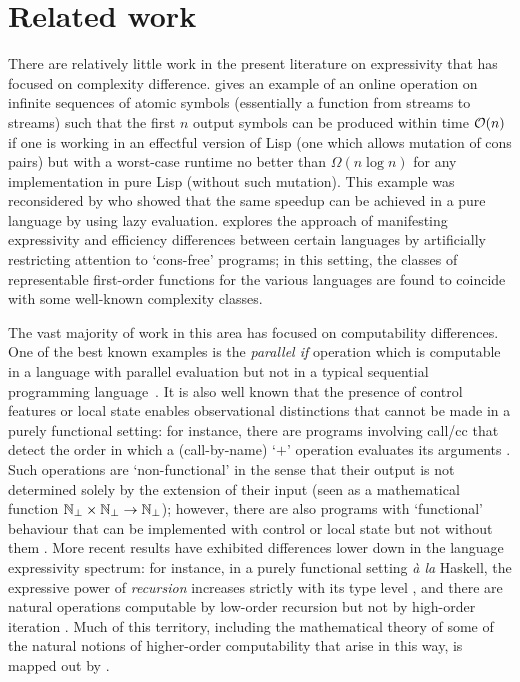 \documentclass[12pt,phd,lfcs,twoside,openright,logo,leftchapter,normalheadings]{infthesis}
\theoremstyle{plain}
\theoremstyle{definition}
\begin{document}
\section{Related work}
There are relatively little work in the present literature on
expressivity that has focused on complexity difference.
%
\citet{Pippenger96} gives an example of an online operation on
infinite sequences of atomic symbols (essentially a function from
streams to streams) such that the first $n$ output symbols can be
produced within time $\mathcal{O}(n)$ if one is working in an effectful
version of Lisp (one which allows mutation of cons pairs) but with a
worst-case runtime no better than $\Omega(n \log n)$ for any
implementation in pure Lisp (without such mutation). This example was
reconsidered by \citet{BirdJdM97} who showed that the same speedup can
be achieved in a pure language by using lazy evaluation.
\citet{Jones01} explores the approach of manifesting expressivity and
efficiency differences between certain languages by artificially
restricting attention to `cons-free' programs; in this setting, the
classes of representable first-order functions for the various
languages are found to coincide with some well-known complexity
classes.

The vast majority of work in this area has focused on computability
differences. One of the best known examples is the \emph{parallel if}
operation which is computable in a language with parallel evaluation
but not in a typical sequential programming
language~\cite{Plotkin77}. It is also well known that the presence of
control features or local state enables observational distinctions
that cannot be made in a purely functional setting: for instance,
there are programs involving call/cc that detect the order in which a
(call-by-name) `$+$' operation evaluates its arguments
\citep{CartwrightF92}. Such operations are `non-functional' in the
sense that their output is not determined solely by the extension of
their input (seen as a mathematical function
$\mathbb{N}_\bot \times \mathbb{N}_\bot \rightarrow \mathbb{N}_\bot$);
however, there are also programs with `functional' behaviour that can
be implemented with control or local state but not without them
\citep{Longley99}.  More recent results have exhibited differences
lower down in the language expressivity spectrum: for instance, in a
purely functional setting \textit{\`a la} Haskell, the expressive
power of \emph{recursion} increases strictly with its type level
\citep{Longley18a}, and there are natural operations computable by
low-order recursion but not by high-order iteration
\citep{Longley19}. Much of this territory, including the mathematical
theory of some of the natural notions of higher-order computability
that arise in this way, is mapped out by \citet{LongleyN15}.
\end{document}
